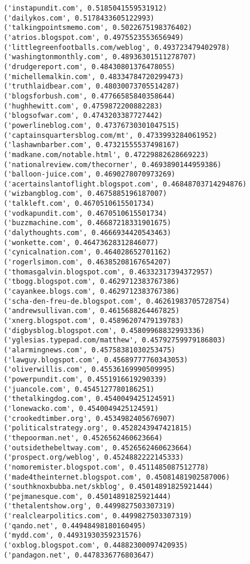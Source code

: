\documentclass[11pt]{article}
\begin{document}
    \begin{Verbatim}[commandchars=\\\{\}]
('instapundit.com', 0.5185041559531912)
('dailykos.com', 0.5178433605122993)
('talkingpointsmemo.com', 0.5022675198376402)
('atrios.blogspot.com', 0.4975523553656949)
('littlegreenfootballs.com/weblog', 0.493723479402978)
('washingtonmonthly.com', 0.48936301511278707)
('drudgereport.com', 0.48430801376478055)
('michellemalkin.com', 0.48334784720299473)
('truthlaidbear.com', 0.48030073705514287)
('blogsforbush.com', 0.47766585840358644)
('hughhewitt.com', 0.4759872200882283)
('blogsofwar.com', 0.4743203387727442)
('powerlineblog.com', 0.47376730301047515)
('captainsquartersblog.com/mt', 0.4733993284061952)
('lashawnbarber.com', 0.47321555537498167)
('madkane.com/notable.html', 0.47229882628669223)
('nationalreview.com/thecorner', 0.4693890144959386)
('balloon-juice.com', 0.4690278070973269)
('acertainslantoflight.blogspot.com', 0.46848703714294876)
('wizbangblog.com', 0.4675885196187007)
('talkleft.com', 0.4670510615501734)
('vodkapundit.com', 0.4670510615501734)
('buzzmachine.com', 0.46687218331901675)
('dalythoughts.com', 0.4666934420543463)
('wonkette.com', 0.46473628312846077)
('cynicalnation.com', 0.464028652701162)
('rogerlsimon.com', 0.46385208167654207)
('thomasgalvin.blogspot.com', 0.46332317394372957)
('tbogg.blogspot.com', 0.4629712383767386)
('cayankee.blogs.com', 0.4629712383767386)
('scha-den-freu-de.blogspot.com', 0.46261983705728754)
('andrewsullivan.com', 0.4615688264467825)
('xnerg.blogspot.com', 0.45896207479139783)
('digbysblog.blogspot.com', 0.45809968832993336)
('yglesias.typepad.com/matthew', 0.45792759979186803)
('alarmingnews.com', 0.45758381030253475)
('lawguy.blogspot.com', 0.45689777760343053)
('oliverwillis.com', 0.45536169990509995)
('powerpundit.com', 0.4551916619290339)
('juancole.com', 0.4545127780186251)
('thetalkingdog.com', 0.4540049425124591)
('lonewacko.com', 0.4540049425124591)
('crookedtimber.org', 0.4534982405676907)
('politicalstrategy.org', 0.4528243947421815)
('thepoorman.net', 0.4526562460623664)
('outsidethebeltway.com', 0.4526562460623664)
('prospect.org/weblog', 0.4524882222145333)
('nomoremister.blogspot.com', 0.4511485087512778)
('made4theinternet.blogspot.com', 0.45081481902587006)
('southknoxbubba.net/skblog', 0.45014891825921444)
('pejmanesque.com', 0.45014891825921444)
('thetalentshow.org', 0.4499827503307319)
('realclearpolitics.com', 0.4499827503307319)
('qando.net', 0.44948498180160495)
('mydd.com', 0.44931930359231576)
('oxblog.blogspot.com', 0.44882300097420935)
('pandagon.net', 0.4478336776803647)

\end{Verbatim}
\end{document}
